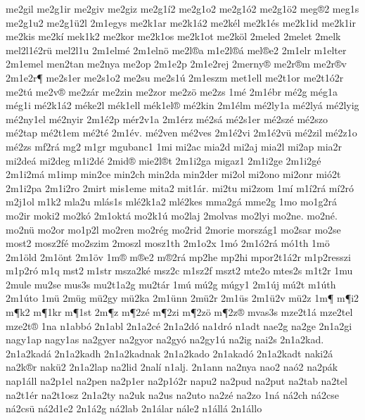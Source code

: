 {me2gil
me2g1ir
me2giv
me2giz
me2g1^^ed2
me2g1o2
me2g1^^f32
me2g1^^f62
meg^^ae2
meg1s
me2g1u2
me2g1^^fc2l
2m1egys
me2k1ar
me2k1^^e12
me2k^^e9l
me2k1^^e9s
me2k1id
me2k1ir
me2kis
me2k^^ed
mek1k2
me2kor
me2k1os
me2k1ot
me2k^^f6l
2meled
2melet
2melk
mel2l1^^e92r^^fc
mel2l1u
2m1elm^^e9
2m1eln^^f6
me2l^^aea
m1e2l^^ae^^e1
mel^^aee2
2m1elr
m1elter
2m1emel
men2tan
me2nya
me2op
2m1e2p
2m1e2rej
2merny^^ae
me2r^^aem
me2r^^aev
2m1e2r^^b6
me2s1er
me2s1o2
me2su
me2s1^^fa
2m1eszm
met1ell
me2t1or
me2t1^^f32r
me2t^^fa
me2v^^ae
me2z^^e1r
me2zin
me2zor
me2z^^f6
me2zs
1m^^e9
2m1^^e9br
m^^e92g
m^^e9g1a
m^^e9g1i
m^^e92k1^^e12
m^^e9ke2l
m^^e9k1ell
m^^e9k1el^^ae
m^^e92kin
2m1^^e9lm
m^^e92ly1a
m^^e92ly^^e1
m^^e92lyig
m^^e92ny1el
m^^e92nyir
2m1^^e92p
m^^e9r2v1a
2m1^^e9rz
m^^e92s^^e1
m^^e92s1er
m^^e92sz^^e9
m^^e92szo
m^^e92tap
m^^e92t1em
m^^e92t^^e9
2m1^^e9v.
m^^e92ven
m^^e92ves
2m1^^e92vi
2m1^^e92v^^fc
m^^e92zil
m^^e92z1o
m^^e92zs
mf2r^^e1
mg2
m1gr
mgubanc1
1mi
mi2ac
mia2d
mi2aj
mia2l
mi2ap
mia2r
mi2de^^e1
mi2deg
m1i2d^^e9
2mid^^ae
mie2l^^aet
2m1i2ga
migaz1
2m1i2ge
2m1i2g^^e9
2m1i2m^^e1
m1imp
min2ce
min2ch
min2da
min2der
mi2ol
mi2ono
mi2onr
mi^^f32t
2m1i2pa
2m1i2ro
2mirt
mis1eme
mita2
mit1^^e1r.
mi2tu
mi2zom
1m^^ed
m1^^ed2r^^e1
m^^ed2r^^f3
m2j1ol
m1k2
mla2u
ml^^e1s1s
ml^^e92k1a2
ml^^e92kes
mma2g^^e1
mme2g
1mo
mo1g2r^^e1
mo2ir
moki2
mo2k^^f3
2m1okt^^e1
mo2k1^^fa
mo2laj
2molvas
mo2lyi
mo2ne.
mo2n^^e9.
mo2n^^fc
mo2or
mo1p2l
mo2ren
mo2r^^e9g
mo2rid
2morie
morsz^^e1g1
mo2sar
mo2se
most2
mosz2f^^e9
mo2szim
2moszl
mosz1th
2m1o2x
1m^^f3
2m1^^f32r^^e1
m^^f31th
1m^^f6
2m1^^f6ld
2m1^^f6nt
2m1^^f6v
1m^^ae
m^^aee2
m^^ae2r^^e1
mp2he
mp2hi
mpor2t1^^e12r
m1p2resszi
m1p2r^^f3
m1q
mst2
m1str
msza2k^^e9
msz2c
m1sz2f
mszt2
mte2o
mtes2s
m1t2r
1mu
2mule
mu2se
mus3s
mu2t1a2g
mu2t^^e1r
1m^^fa
m^^fa2g
m^^fagy1
2m1^^faj
m^^fa2t
m1^^fath
2m1^^fato
1m^^fc
2m^^fcg
m^^fc2gy
m^^fc2ka
2m1^^fcnn
2m^^fc2r
2m1^^fcs
2m1^^fc2v
m^^fc2z
1m^^b6
m^^b6i2
m^^b6k2
m^^b61kr
m^^b61st
2m^^b6z
m^^b62z^^e9
m^^b62zi
m^^b62z^^f6
m^^b62z^^ae
mvas3s
mze2t1^^e1
mze2tel
mze2t^^ae
1na
n1abb^^f3
2n1abl
2n1a2c^^e9
2n1a2d^^f3
na1dr^^f3
n1adt
nae2g
na2ge
2n1a2gi
nagy1ap
nagy1as
na2gyer
na2gyor
na2gy^^f3
na2gy1^^fa
na2ig
nai2s
2n1a2kad.
2n1a2kad^^e1
2n1a2kadh
2n1a2kadnak
2n1a2kado
2n1akad^^f3
2n1a2kadt
naki2^^e1
na2k^^aer
nak^^fc2
2n1a2lap
na2lid
2nal^^ed
n1alj.
2n1ann
na2nya
nao2
na^^f32
na2p^^e1k
nap1^^e1ll
na2p1el
na2pen
na2p1er
na2p1^^f32r
napu2
na2pud
na2put
na2tab
na2tel
na2t1^^e9r
na2t1osz
2n1a2ty
na2uk
na2us
na2uto
na2z^^e9
na2zo
1n^^e1
n^^e12ch
n^^e12cse
n^^e12cs^^fc
n^^e12d1e2
2n1^^e12g
n^^e12lab
2n1^^e1lar
n^^e1le2
n1^^e1ll^^e1
2n1^^e1llo
}

